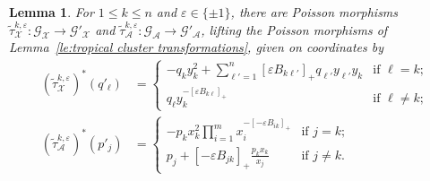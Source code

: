 \documentclass{amsart}
\newtheorem{lemma}[theorem]{Lemma}
\numberwithin{equation}{section}
\newcommand{\cA}{\mathcal{A}}
\newcommand{\cG}{\mathcal{G}}
\newcommand{\cX}{\mathcal{X}}
\begin{document}
\begin{lemma}
  \label{le:tropical groupoid transformations}
  For $1\le k\le n$ and $\varepsilon\in\{\pm1\}$, there are Poisson morphisms $\tilde\tau_\cX^{k,\varepsilon}:\cG_\cX\to\cG'_\cX$ and $\tilde\tau_\cA^{k,\varepsilon}:\cG_\cA\to\cG'_\cA$, lifting the Poisson morphisms of Lemma~\ref{le:tropical cluster transformations}, given on coordinates by
  \begin{align}
    \label{eq:tropical X transformation}
    (\tilde\tau_\cX^{k,\varepsilon})^*(q'_\ell)
    &=\begin{cases} 
      -q_k y_k^2 + \sum\limits_{\ell'=1}^n[\varepsilon B_{k\ell'}]_+ q_{\ell'} y_{\ell'} y_k & \text{if $\ell=k$;}\\ 
      q_\ell y_k^{-[\varepsilon B_{k\ell}]_+} & \text{if $\ell\ne k$;}
    \end{cases}\\
    \label{eq:tropical A transformation}
    (\tilde\tau_\cA^{k,\varepsilon})^*(p'_j)&=
    \begin{cases} 
      -p_k x_k^2 \prod\limits_{i=1}^m x_i^{-[-\varepsilon B_{ik}]_+} & \text{if $j=k$;}\\ 
      p_j+[-\varepsilon B_{jk}]_+\frac{p_k x_k}{x_j} & \text{if $j\ne k$.}
    \end{cases}
  \end{align}
\end{lemma}
\end{document}
